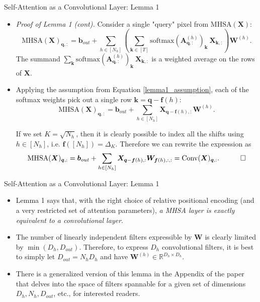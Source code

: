 \documentclass[9pt]{beamer}
\newcommand{\bb}{\mathbb}
\newcommand{\mb}{\bm}
\begin{document}
\newcommand{\row}[1]{_{#1,:}}
\begin{frame}{Self-Attention as a Convolutional Layer: Lemma 1}
\begin{itemize}
\item \textit{Proof of Lemma 1 (cont).} Consider a single "query" pixel from $\mathrm{MHSA}(\bm X)$:
\begin{equation}
    \mathrm{MHSA}(\mb X)\row {\mb q} = \mb b_{out} + 
        \sum_{h\in[N_h]} \left( \sum_{\mb k\in [T]} 
            \mathrm{softmax}(\mb A^{(h)}\row {\mb q})_{\mb k}\ \mb X\row{\mb k} 
        \right) \mb W^{(h)} .
\end{equation}
The summand $\sum_{\mb k} \mathrm{softmax}(\mb A^{(h)}\row {\mb q})_{\mb k}\ \mb X\row{\mb k}$ is a weighted average on the rows of $\bm X$. 

\item Applying the assumption from Equation \eqref{lemma1_assumption}, each of the softmax weights pick out a single row $\bm k = \bm q - \bm f(h)$:
\begin{equation}
    \mathrm{MHSA}(\mb X)\row {\mb q} = \mb b_{out} + 
        \sum_{h\in[N_h]}  \mb X\row{\mb q - \mb f(h)} \mb W^{(h)} .
\end{equation}

If we set $K=\sqrt{N_h}$, then it is clearly possible to index all the shifts using $h\in[N_h]$, i.e. $\bm f([N_h]) = \Delta_K$. Therefore we can rewrite the expression as
\begin{equation}
    \mathrm{MHSA}(\mb X)\row {\mb q} = \mb b_{out} + 
        \sum_{h\in[N_h]}  \mb X\row{\mb q - \mb f(h)} \mb W_{\mb f(h), :, :} 
        = \mathrm{Conv}(\mb X)\row{\mb q}. 
    \quad\qed
\end{equation}
\end{itemize}
\end{frame}


\begin{frame}{Self-Attention as a Convolutional Layer: Lemma 1}
\begin{itemize}
\item Lemma 1 says that, with the right choice of relative positional encoding (and a very restricted set of attention parameters), {\em a MHSA layer is exactly equivalent to a convolutional layer}.

\vspace{.1in}
\item The number of linearly independent filters expressible by $\bm W$ is clearly limited by $\min(D_h, D_{out})$. Therefore, to express $D_h$ convolutional filters, it is best to simply let $D_{out} = N_hD_h$ and have $\bm W^{(h)}\in\bb R^{D_h\times D_h}$. 

\vspace{.1in}
\item There is a generalized version of this lemma in the Appendix of the paper that delves into the space of filters spannable for a given set of dimensions $D_h, N_h, D_{out}$, etc., for interested readers.
\end{itemize}
\end{frame}
\end{document}

